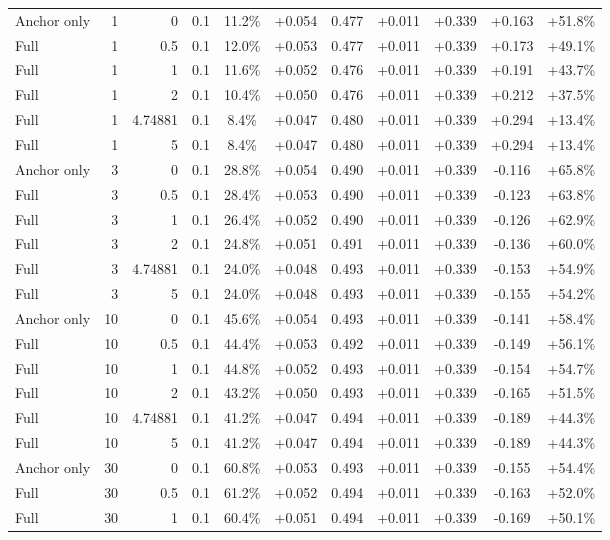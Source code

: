 \begin{table}[htbp]
\begin{tabular}{lrrrccccccc}
Anchor only & 1 & 0 & 0.1 & 11.2\% & +0.054 & 0.477 & +0.011 & +0.339 & +0.163 & +51.8\% \\
Full & 1 & 0.5 & 0.1 & 12.0\% & +0.053 & 0.477 & +0.011 & +0.339 & +0.173 & +49.1\% \\
Full & 1 & 1 & 0.1 & 11.6\% & +0.052 & 0.476 & +0.011 & +0.339 & +0.191 & +43.7\% \\
Full & 1 & 2 & 0.1 & 10.4\% & +0.050 & 0.476 & +0.011 & +0.339 & +0.212 & +37.5\% \\
Full & 1 & 4.74881 & 0.1 & 8.4\% & +0.047 & 0.480 & +0.011 & +0.339 & +0.294 & +13.4\% \\
Full & 1 & 5 & 0.1 & 8.4\% & +0.047 & 0.480 & +0.011 & +0.339 & +0.294 & +13.4\% \\
Anchor only & 3 & 0 & 0.1 & 28.8\% & +0.054 & 0.490 & +0.011 & +0.339 & -0.116 & +65.8\% \\
Full & 3 & 0.5 & 0.1 & 28.4\% & +0.053 & 0.490 & +0.011 & +0.339 & -0.123 & +63.8\% \\
Full & 3 & 1 & 0.1 & 26.4\% & +0.052 & 0.490 & +0.011 & +0.339 & -0.126 & +62.9\% \\
Full & 3 & 2 & 0.1 & 24.8\% & +0.051 & 0.491 & +0.011 & +0.339 & -0.136 & +60.0\% \\
Full & 3 & 4.74881 & 0.1 & 24.0\% & +0.048 & 0.493 & +0.011 & +0.339 & -0.153 & +54.9\% \\
Full & 3 & 5 & 0.1 & 24.0\% & +0.048 & 0.493 & +0.011 & +0.339 & -0.155 & +54.2\% \\
Anchor only & 10 & 0 & 0.1 & 45.6\% & +0.054 & 0.493 & +0.011 & +0.339 & -0.141 & +58.4\% \\
Full & 10 & 0.5 & 0.1 & 44.4\% & +0.053 & 0.492 & +0.011 & +0.339 & -0.149 & +56.1\% \\
Full & 10 & 1 & 0.1 & 44.8\% & +0.052 & 0.493 & +0.011 & +0.339 & -0.154 & +54.7\% \\
Full & 10 & 2 & 0.1 & 43.2\% & +0.050 & 0.493 & +0.011 & +0.339 & -0.165 & +51.5\% \\
Full & 10 & 4.74881 & 0.1 & 41.2\% & +0.047 & 0.494 & +0.011 & +0.339 & -0.189 & +44.3\% \\
Full & 10 & 5 & 0.1 & 41.2\% & +0.047 & 0.494 & +0.011 & +0.339 & -0.189 & +44.3\% \\
Anchor only & 30 & 0 & 0.1 & 60.8\% & +0.053 & 0.493 & +0.011 & +0.339 & -0.155 & +54.4\% \\
Full & 30 & 0.5 & 0.1 & 61.2\% & +0.052 & 0.494 & +0.011 & +0.339 & -0.163 & +52.0\% \\
Full & 30 & 1 & 0.1 & 60.4\% & +0.051 & 0.494 & +0.011 & +0.339 & -0.169 & +50.1\% \\

\end{tabular}
\end{table}
